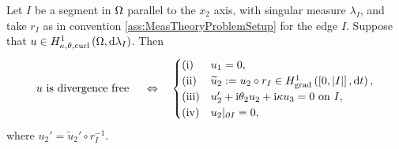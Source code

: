 \begin{prop} \label{prop:DivFreeSegment}
	Let $I$ be a segment in $\Omega$ parallel to the $x_2$ axis, with singular measure $\lambda_I$, and take $r_I$ as in convention \ref{ass:MeasTheoryProblemSetup} for the edge $I$.
	Suppose that $u\in H^1_{\kappa,\theta,\mathrm{curl}}\left( \Omega, \mathrm{d}\lambda_I \right)$.
	Then
	\begin{align*}
		u \text{ is divergence free } \quad\Leftrightarrow\quad 
		\begin{cases}
			\mathrm{(i)} & u_1 = 0, \\
			\mathrm{(ii)} & \widetilde{u}_2 := u_2 \circ r_I \in H^1_\mathrm{grad}\left( \left[ 0,\left\lvert I \right\rvert \right], \mathrm{d}t \right), \\
			\mathrm{(iii)} & u_2' + \mathrm{i}\theta_2 u_2 + \mathrm{i}\kappa u_3 = 0 \text{ on } I, \\
			\mathrm{(iv)} & u_2\vert_{\partial I} = 0,
		\end{cases}
	\end{align*}
	where $u_2' = \widetilde{u}_2'\circ r_I^{-1}$.
\end{prop}
